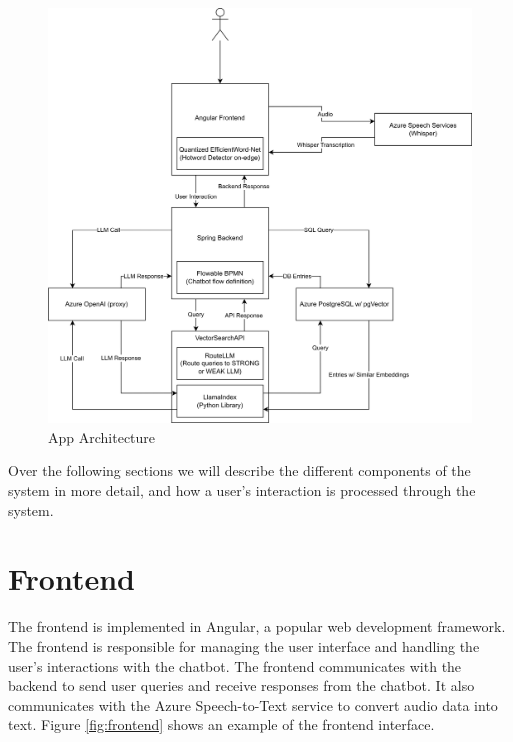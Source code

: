 \documentclass[a4paper,12pt,twoside]{ThesisStyle}
\begin{document}
\begin{figure}[htb]
  \centering
  \includegraphics[width=1\textwidth]{imatges/Full DSO App Architecture.drawio.png}
  \caption{App Architecture}
  \label{fig:architecture}
\end{figure}

Over the following sections we will describe the different components of the system in more detail, and how a user's interaction is processed through the system.

\section{Frontend}
\label{sec:frontend}

The frontend is implemented in Angular, a popular web development framework. The frontend is responsible for managing the user interface and handling the user's interactions with the chatbot. The frontend communicates with the backend to send user queries and receive responses from the chatbot. It also communicates with the Azure Speech-to-Text service to convert audio data into text. Figure \ref{fig:frontend} shows an example of the frontend interface.
\end{document}
